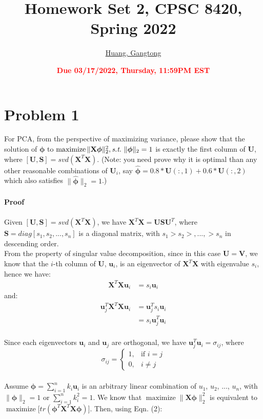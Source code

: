 \documentclass[11pt]{article}
\title{{\bf Homework Set 2, CPSC 8420, Spring 2022}} %
\author{\Large\underline{Huang, Gangtong}}
\date{\textbf{\Large\textcolor{red}{Due 03/17/2022, Thursday, 11:59PM EST}}} %
\newcommand{\maximize}{\operatorname*{maximize}}
\newcommand{\mtx}[1]{\mathbf{#1}}
\newcommand{\vct}[1]{\mathbf{#1}}
\def \mU {\mtx{U}}
\def \mS {\mtx{S}}
\def \mV {\mtx{V}}
\def \mX {\mtx{X}}
\def \vu {\vct{u}}
\def \vphi {\vct{\phi}}
\begin{document}
	\maketitle
	

	\section*{Problem 1}
	For PCA, from the perspective of maximizing variance, please show that the solution of $\bm{\phi}$ to $\maximize \|\mX \bm{\phi}\|^2_2, \st \ \|\bm{\phi}\|_2=1$ is exactly the first column of $\mU$, where $[\mU,\mS]=svd(\mX^T\mX)$. (Note: you need prove why it is optimal than any other reasonable combinations of $\mU_i$, say $\hat{\bm{\phi}}=0.8*\mU(:,1)+0.6*\mU(:,2)$ which also  satisfies $\|\hat{\bm{\phi}}\|_2=1$.)\\ \\
	\textbf{Proof}
	\\ \\
	Given $[\mU,\mS]=svd(\mX^T\mX)$, we have $\mX^T\mX=\mU\mS\mU^T$, where $\mS=diag[s_1, s_2 ,..., s_n]$ is a diagonal matrix, with $s_1 > s_2 >,..., > s_n$ in descending order.
	\\
	From the property of singular value decomposition, since in this case $\mU=\mV$, we know that the $i$-th column of $\mU$, $\vu_i$, is an eigenvector of $\mX^T\mX$ with eigenvalue $s_i$, hence we have:
	\begin{equation}
	\begin{aligned}
	\mX^T\mX \vu_i&=s_i\vu_i
	\end{aligned}
	\end{equation}
and:
	\begin{equation}
	\begin{aligned}
	\vu_j^T \mX^T\mX \vu_i &= \vu_j^Ts_i\vu_i\\
	&= s_i\vu_j^T\vu_i
	\end{aligned}
	\end{equation}
\\ Since each eigenvectors $\vu_i$ and $\vu_j$ are orthogonal, we have $\vu_j^T\vu_i=\sigma_{ij}$, where 
\[
    \sigma_{ij}= 
\begin{cases}
    1,& \text{if } i = j\\
    0,& i \neq j
\end{cases}
\]
	\\ 
	Assume $\vphi=\sum_{i=1}^{n}k_i\vu_i$ is an arbitrary linear combination of $u_1$, $u_2$, ..., $u_n$, with $\|\vphi\|_2=1$ or $\sum_{i=1}^{n}k_i^2=1$. We know that $\maximize \|\mX \bm{\phi}\|^2_2$ is equivalent to $\maximize [tr(\vphi^T\mX^T\mX\vphi)$]. Then, using Eqn. (2):
\end{document}
